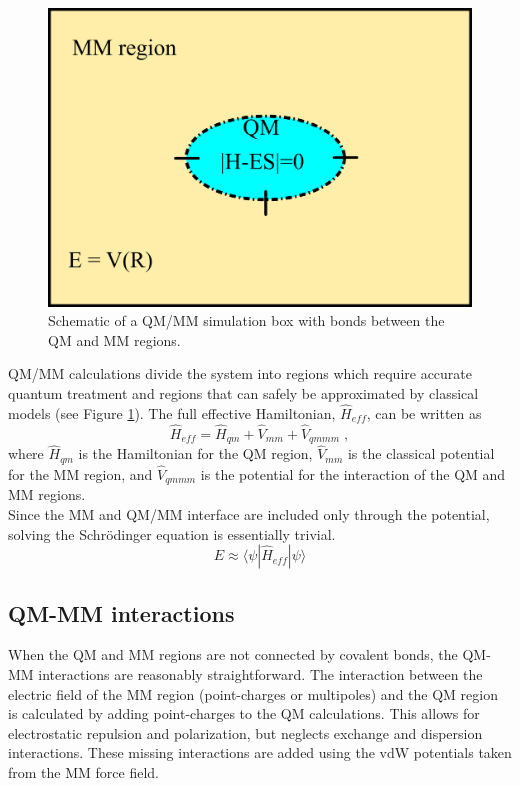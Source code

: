 \documentclass[12pt]{report}
\begin{document}
\begin{figure}[hbt]
 \centering
 \includegraphics[scale=0.50]{../doc/images/QMMM_1.png}
 \caption{
 Schematic of a QM/MM simulation box with bonds between the QM and MM
 regions.}
 \label{fig:QMMM1}
\end{figure}

QM/MM calculations divide the system into regions which require accurate
quantum treatment and regions that can safely be approximated by classical
models (see Figure \ref{fig:QMMM1}).
The full effective Hamiltonian,
$\hat H_{eff}$, can be written as
\begin{equation}
 \hat H_{eff} = \hat H_{qm} + \hat V_{mm} + \hat V_{qmmm} \; ,
\end{equation}
where $\hat H_{qm}$ is the Hamiltonian for the QM region, $\hat V_{mm}$
is the classical potential for the MM region, and $\hat V_{qmmm}$ is the
potential for the interaction of the QM and MM regions. \\

Since the MM and QM/MM interface are included only through the potential,
solving the Schr\"odinger equation is essentially trivial.
\begin{equation}
 E \approx \langle \psi |\hat H_{eff}|\psi \rangle
\end{equation}

\subsection{QM-MM interactions}

When the QM and MM regions are not connected by covalent bonds, the QM-MM
interactions are reasonably straightforward.
The interaction between the electric field of the MM region (point-charges or
multipoles) and the QM region is calculated by adding point-charges to the QM
calculations.
This allows for electrostatic repulsion and polarization, but neglects
exchange and dispersion interactions.
These missing interactions are added using the vdW potentials taken from the
MM force field. \\
\end{document}
